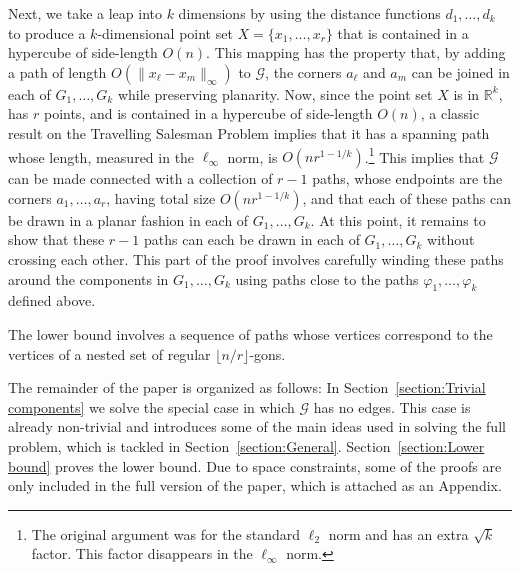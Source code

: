 \documentclass{patmorin}
\newcommand{\etal}{\emph{et al.}}
\newcommand{\R}{\mathbb{R}}
\begin{document}
Next, we take a leap into $k$ dimensions by using the distance
functions $d_1,\ldots,d_k$ to produce a $k$-dimensional point set
$X=\{x_1,\ldots,x_r\}$ that is contained in a hypercube of side-length $O(n)$.
This mapping has the property that, by adding a path of length $O(\|x_\ell
-x_m\|_\infty)$ to $\mathcal G$, the corners $a_\ell$ and $a_m$ can be joined
in each of $G_1,\ldots,G_k$ while preserving planarity.
Now, since the point set $X$ is in $\R^k$, has $r$ points, and
is contained in a hypercube of side-length $O(n)$, a classic
result on the Travelling Salesman Problem \cite{few:shortest,moran:on} implies that it has a spanning path whose length, measured in the $\ell_\infty$ norm,
is $O(nr^{1-1/k})$.\footnote{The original argument was for the standard
$\ell_2$ norm and has an extra $\sqrt{k}$ factor.  This factor disappears
in the $\ell_\infty$ norm.}  This implies that $\mathcal G$ can be made
connected with a collection of $r-1$ paths, whose endpoints are the
corners $a_1,\ldots,a_r$, having total size $O(nr^{1-1/k})$, and
that each of these paths can be drawn in a planar fashion in each
of $G_1,\ldots,G_k$.
At this point, it remains to show that these $r-1$ paths
can each be drawn in each of $G_1,\ldots,G_k$ without crossing
each other.  This part of the proof involves carefully winding these
paths around the components in $G_1,\ldots,G_k$ using paths close
to the paths $\varphi_1,\ldots,\varphi_k$ defined above.

The lower bound involves a sequence of paths whose vertices correspond to the vertices of
a nested set of regular $\lfloor n/r\rfloor$-gons.

The remainder of the paper is organized as follows: In
Section~\ref{section:Trivial components} we solve the special case in which $\mathcal G$ has no edges. This
case is already non-trivial and introduces some of the
main ideas used in solving the full problem, which is tackled in
Section~\ref{section:General}. Section~\ref{section:Lower bound}
proves the lower bound. Due to space constraints, some of the proofs are only included in the full version of the paper, which is attached as an Appendix.


\end{document}
